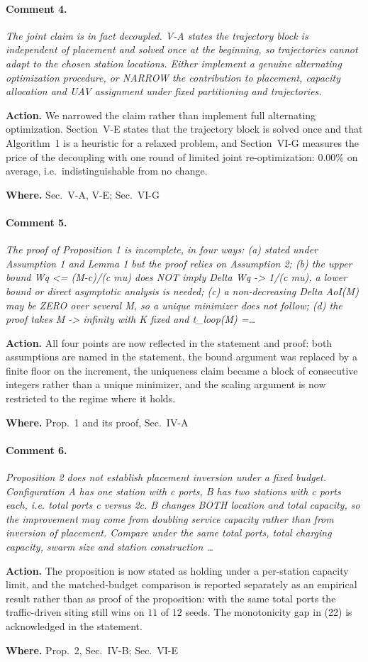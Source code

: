 \documentclass[10pt]{article}
\newcommand{\rev}[1]{\par\medskip\noindent\textit{#1}\par\smallskip}
\newcommand{\act}[2]{\noindent\textbf{Action.} #1\par\noindent\textbf{Where.} #2\par}
\begin{document}
\paragraph{Comment 4.}
\rev{The joint claim is in fact decoupled. V-A states the trajectory block is independent of placement and solved once at the beginning, so trajectories cannot adapt to the chosen station locations. Either implement a genuine alternating optimization procedure, or NARROW the contribution to placement, capacity allocation and UAV assignment under fixed partitioning and trajectories.}
\act{We narrowed the claim rather than implement full alternating optimization. Section~V-E states that the trajectory block is solved once and that Algorithm~1 is a heuristic for a relaxed problem, and Section~VI-G measures the price of the decoupling with one round of limited joint re-optimization: $0.00\%$ on average, i.e.\ indistinguishable from no change.}{Sec.~V-A, V-E; Sec.~VI-G}

\paragraph{Comment 5.}
\rev{The proof of Proposition 1 is incomplete, in four ways: (a) stated under Assumption 1 and Lemma 1 but the proof relies on Assumption 2; (b) the upper bound Wq <= (M-c)/(c mu) does NOT imply Delta Wq -> 1/(c mu), a lower bound or direct asymptotic analysis is needed; (c) a non-decreasing Delta AoI(M) may be ZERO over several M, so a unique minimizer does not follow; (d) the proof takes M -> infinity with K fixed and t\_loop(M) =\dots}
\act{All four points are now reflected in the statement and proof: both assumptions are named in the statement, the bound argument was replaced by a finite floor on the increment, the uniqueness claim became a block of consecutive integers rather than a unique minimizer, and the scaling argument is now restricted to the regime where it holds.}{Prop.~1 and its proof, Sec.~IV-A}

\paragraph{Comment 6.}
\rev{Proposition 2 does not establish placement inversion under a fixed budget. Configuration A has one station with c ports, B has two stations with c ports each, i.e. total ports c versus 2c. B changes BOTH location and total capacity, so the improvement may come from doubling service capacity rather than from inversion of placement. Compare under the same total ports, total charging capacity, swarm size and station construction \dots}
\act{The proposition is now stated as holding under a per-station capacity limit, and the matched-budget comparison is reported separately as an empirical result rather than as proof of the proposition: with the same total ports the traffic-driven siting still wins on $11$ of $12$ seeds. The monotonicity gap in (22) is acknowledged in the statement.}{Prop.~2, Sec.~IV-B; Sec.~VI-E}
\end{document}

